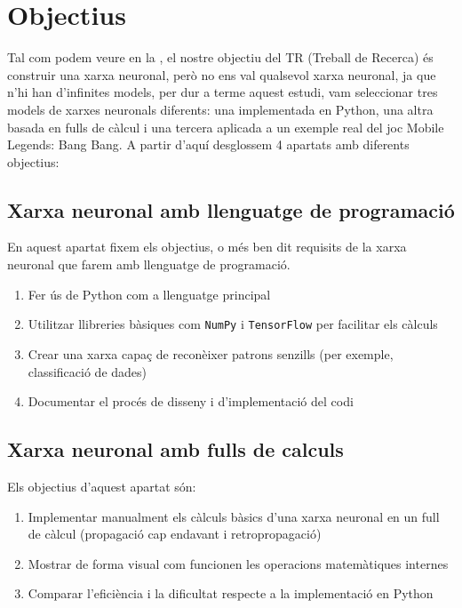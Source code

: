 \chapter{Objectius}
\label{c:objectius}
Tal com podem veure en la , el nostre objectiu del TR (Treball de Recerca) és construir una xarxa neuronal, però no ens val qualsevol xarxa neuronal, ja que n'hi han d'infinites  models, per dur a terme aquest estudi, vam seleccionar tres models de xarxes neuronals diferents: una implementada en Python, una altra basada en fulls de càlcul i una tercera aplicada a un exemple real del joc Mobile Legends: Bang Bang. A partir d'aquí desglossem 4 apartats amb diferents objectius:    


\section{Xarxa neuronal amb llenguatge de programació}\label{sec:Xarxa neuronal amb llenguatge de programació}
En aquest apartat fixem els objectius, o més ben dit requisits de la xarxa neuronal que farem amb llenguatge de programació.
\begin{enumerate}[label=\alph*)]
 \item Fer ús de Python com a llenguatge principal
 \item Utilitzar llibreries bàsiques com \texttt{NumPy} i \texttt{TensorFlow} per facilitar els càlculs
 \item Crear una xarxa capaç de reconèixer patrons senzills (per exemple, classificació de dades)
 \item Documentar el procés de disseny i d’implementació del codi
\end{enumerate}


\section{Xarxa neuronal amb fulls de calculs}\label{sec:Xarxa neuronal amb fulls de calculs}
Els objectius d’aquest apartat són:
\begin{enumerate}[label=\alph*)]
\item Implementar manualment els càlculs bàsics d’una xarxa neuronal en un full de càlcul (propagació cap endavant i retropropagació)
\item Mostrar de forma visual com funcionen les operacions matemàtiques internes
\item Comparar l’eficiència i la dificultat respecte a la implementació en Python
\end{enumerate}


